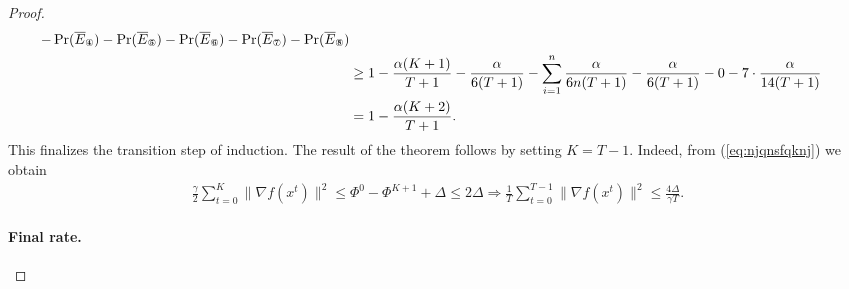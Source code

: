 \documentclass[a4paper,11pt]{article}
\begin{document}
\begin{proof}
\begin{align*}
    - \Pr(\overline{E}_{\circledFour})
    - \Pr(\overline{E}_{\circledFive})
    - \Pr(\overline{E}_{\circledSix})
    - \Pr(\overline{E}_{\circledSeven})
    - \Pr(\overline{E}_{\circledEight})\\
    &\ge 1 - \frac{\alpha(K+1)}{T+1}
    - \frac{\alpha}{6(T+1)}
    - \sum_{i=1}^n \frac{\alpha}{6n(T+1)}
    - \frac{\alpha}{6(T+1)}
    - 0- 7\cdot \frac{\alpha}{14(T+1)}\\
    &= 1-\frac{\alpha(K+2)}{T+1}.
    \end{align*}
    This finalizes the transition step of induction. The result of the theorem follows by setting $K=T-1$. Indeed, from (\ref{eq:njqnsfqknj}) we obtain
    \begin{align}\label{eq:mfweodjnwej}
        \frac{\gamma}{2}\sum_{t=0}^K\|\nabla f(x^t)\|^2 
        \le \Phi^0 
        - \Phi^{K+1} 
        + \Delta 
        \le 2\Delta 
        \Rightarrow \frac{1}{T}\sum_{t=0}^{T-1}\|\nabla f(x^t)\|^2 
        \le \frac{4\Delta}{\gamma T}.
    \end{align}

    \paragraph{Final rate.}


\end{proof}
\end{document}
